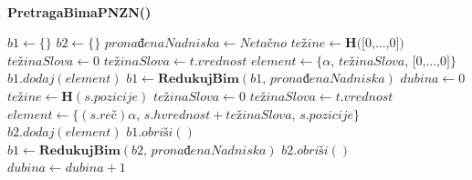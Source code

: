 \documentclass[12pt,oneside]{memoir}
\begin{document}
\\
\begin{algorithm}
  \caption{\textbf{PretragaBimaPNZN()}}
  \label{alg:bs}
  \begin{algorithmic}[1]
  \State $b1 \gets \{ \}$
  \State $b2 \gets \{ \}$
  \State $prona\textrm{đ}enaNadniska \gets Neta\textrm{č}no$
  \State
  \State $te\textrm{ž}ine \gets \textbf{H}\textrm{([0,...,0])}$
  \State
  \For{$\alpha\in\Sigma$}
    \State $te\textrm{ž}inaSlova \gets 0$
        \State $te\textrm{ž}inaSlova \gets t\textrm{.}vrednost$
      \EndIf
    \EndFor
    \State $element \gets \{\alpha\textrm{, }te\textrm{ž}inaSlova \textrm{, [0,...,0]}\}$
    \State $b1\textrm{.}dodaj(element)$
  \EndFor
  \State
  \State $b1 \gets \textbf{RedukujBim}(b1\textrm{, }prona\textrm{đ}enaNadniska)$
  \State $dubina \gets 0$
  \State
      \State $te\textrm{ž}ine \gets \textbf{H}(s.pozicije)$
      \State
      \For{$\alpha\in\Sigma$}
        \State $te\textrm{ž}inaSlova \gets 0$
            \State $te\textrm{ž}inaSlova \gets t.vrednost$
          \EndIf
        \EndFor
      \State $element \gets \{(s.re\textrm{č})\alpha\textrm{, }s.hvrednost + te\textrm{ž}inaSlova\textrm{, }s.pozicije\}$
      \State $b2\textrm{.}dodaj(element)$
      \EndFor
    \EndFor
    \State
    \State $b1\textrm{.}obri\textrm{š}i()$
    \State $b1 \gets \textbf{RedukujBim}(b2\textrm{, }prona\textrm{đ}enaNadniska)$
    \State $b2\textrm{.}obri\textrm{š}i()$
    \State $dubina \gets dubina + 1$
  \EndWhile
  \end{algorithmic}
  \end{algorithm}
\\
\\
\\
\end{document}
